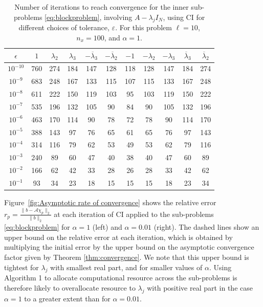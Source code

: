 \documentclass{article}
\newcommand{\sizeA}{N}
\theoremstyle{definition}
\begin{document}
{		\begin{table}[htb]
			\centering
			\begin{tabular}{c|cccccccccc}
				$\epsilon$  &   $1$ & $\lambda_2$ & $\lambda_3$ & $-\overline{\lambda}_3$& $-\overline{\lambda}_2$ &$  -1$& $-\lambda_2$ & $-\lambda_3$ & $\overline{\lambda}_3$ & $\overline{\lambda}_2$ \\
				\hline
				$10^{-10}$ &760 &  274 &  184 &  147  & 128 &  118 &  128 &  147 &  184 &  274\\
				$10^{-9}$&683 &  248 &  167 &  133 &  115 &  107 &  115 &  133 &  167 &  248\\
				$10^{-8}$&611 &  222 &  150 &  119 &  103 &   95 &  103 &  119 &  150 &  222\\
				$10^{-7}$&535 &  196 &  132 &  105 &   90 &   84 &   90 &  105 &  132 &  196\\
				$10^{-6}$&463 &  170 &  114 &   90 &   78 &   72  &  78 &   90 &  114 &  170\\
				$10^{-5}$&388 &  143 &   97 &   76 &   65 &   61  &  65 &   76 &   97 &  143\\
				$10^{-4}$&314 &  116 &   79 &   62 &   53 &   49  &  53 &   62 &   79 &  116\\
				$10^{-3}$&240 &   89 &   60 &   47 &   40 &   38  &  40 &   47 &   60 &   89\\
				$10^{-2}$&166 &   62 &   42 &   33 &   28 &   26  &  28 &   33  &  42 &   62\\
				$10^{-1}$& 93&    34 &   23 &   18 &   15 &   15  &  15 &   18  &  23 &   34
			\end{tabular}
			\caption{Number of iterations to reach convergence for the inner sub-problems \eqref{eq:blockproblem}, involving $A-\lambda_j I_\sizeA$, using CI for different choices of tolerance, $\varepsilon$. For this problem $\ell=10$, $n_x=100$, and $\alpha=1$.}
			\label{tab:Cheb conv tol}
		\end{table}
		
		Figure~\ref{fig:Asymptotic rate of convergence} shows the relative error $r_p = \frac{\|b-\mathcal{A}\chi_p\|_2}{\|b\|_2}$ at each iteration of CI applied to the sub-problems \eqref{eq:blockproblem} for $\alpha=1$ (left) and $\alpha=0.01$ (right). The dashed lines show an upper bound on the relative error at each iteration, which is obtained by multiplying the initial error by the upper bound on the asymptotic  convergence factor given by Theorem \ref{thm:convergence}. 
		We note that this upper bound is tightest for $\lambda_j$ with smallest real part, and for smaller values of $\alpha$. Using  Algorithm 1 to allocate computational resource across the sub-problems is therefore likely to overallocate resource to $\lambda_j$ with positive real part in the case $\alpha=1$ to a greater extent than for  $\alpha=0.01$.
		
}
\end{document}
